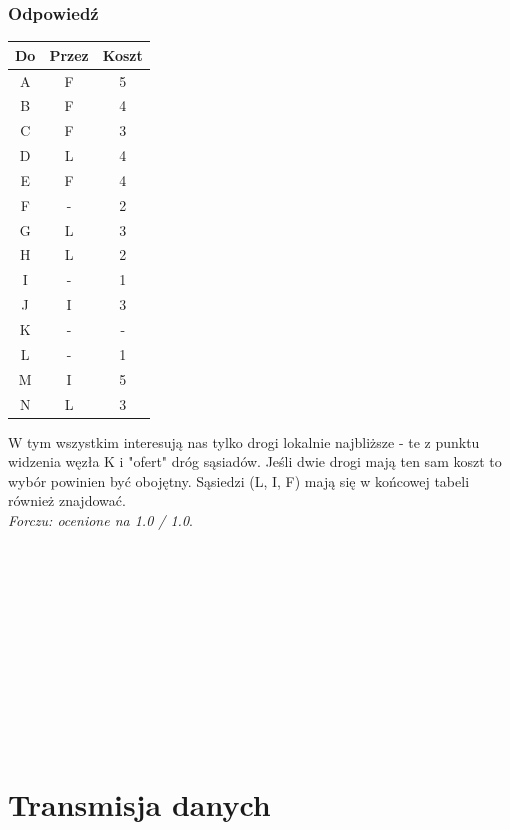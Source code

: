 		\subsubsection{Odpowiedź}
		\begin{table}
			\begin{tabular}{c|c|c}
				Do & Przez & Koszt \\ \hline
				A  & F     & 5     \\
				B  & F     & 4     \\
				C  & F     & 3     \\
				D  & L     & 4     \\
				E  & F     & 4     \\
				F  & -     & 2     \\
				G  & L     & 3     \\
				H  & L     & 2     \\
				I  & -     & 1     \\
				J  & I     & 3     \\
				K  & -     & -     \\
				L  & -     & 1     \\
				M  & I     & 5     \\
				N  & L     & 3    
			\end{tabular}
		\end{table}
		W tym wszystkim interesują nas tylko drogi lokalnie najbliższe - te z punktu widzenia węzła K i "ofert" dróg sąsiadów. Jeśli dwie drogi mają ten sam koszt to wybór powinien być obojętny. Sąsiedzi (L, I, F) mają się w końcowej tabeli również znajdować.\\
		\small{ \emph{Forczu: ocenione na 1.0 / 1.0}}.\\\\\\\\\\\\\\\\\\\\\\\\
		
\newpage
\section{Transmisja danych}
